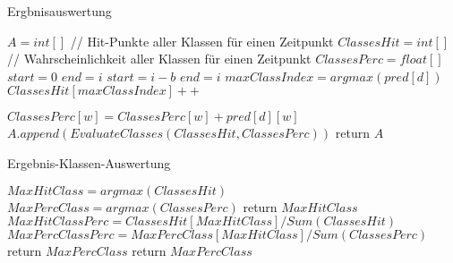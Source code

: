     
    \begin{algorithm}\label{alg:Ergbnisauswertung}
        \caption{Ergbnisauswertung}
        \begin{algorithmic}[1]
            \State {}
            \State
            \State ${A} = int[ ]$
                \State
                \State // Hit-Punkte aller Klassen für einen Zeitpunkt
                \State $ClassesHit = int[ ]$
                \State // Wahrscheinlichkeit aller Klassen für einen Zeitpunkt
                \State $ClassesPerc = float[ ]$
                \State
                    \State $start = 0$
                    \State $end = i$
                \Else
                    \State $start = i - b$
                    \State $end = i$
                \EndIf
                \State
                    \State $maxClassIndex = argmax(pred[d])$
                    \State $ClassesHit[maxClassIndex]++$

                        \State $ClassesPerc[w] = ClassesPerc[w] + pred[d][w]$
                    \EndFor
                \EndFor
                \State
                \State $A.append(EvaluateClasses(ClassesHit, ClassesPerc))$
                \State
            \EndFor
            \State return $A$
        \EndFunction
        \end{algorithmic}
    \end{algorithm}
    \begin{algorithm}
        \caption{Ergebnis-Klassen-Auswertung}
        \begin{algorithmic}[1]
            \State {}
            \State
            \State $MaxHitClass = argmax(ClassesHit)$
            \State $MaxPercClass = argmax(ClassesPerc)$
            \State
                \State return $MaxHitClass$
            \Else
                \State
                \State $MaxHitClassPerc = ClassesHit[MaxHitClass] / Sum(ClassesHit) $
                \State $MaxPercClassPerc = MaxPercClass[MaxHitClass] / Sum(ClassesPerc) $
                \State
                    \State return $MaxPercClass$
                \Else
                    \State return $MaxPercClass$
                \EndIf
            \EndIf
        \EndFunction
        \end{algorithmic}
    \end{algorithm}
